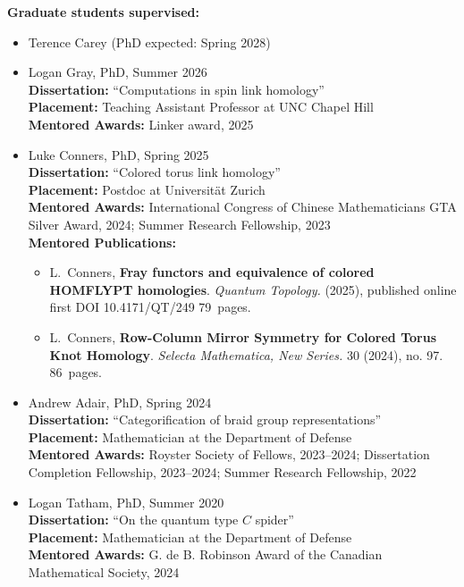 \documentclass[10pt]{article}
\begin{document}
\smallskip
\noindent\textbf{Graduate students supervised:}
\begin{itemize}

\item Terence Carey (PhD expected: Spring 2028)

\item Logan Gray, PhD, Summer 2026 \\
\noindent \textbf{Dissertation:} ``Computations in spin link homology'' \\
\noindent \textbf{Placement:} Teaching Assistant Professor at UNC Chapel Hill \\
\textbf{Mentored Awards:} 
Linker award, 2025


\item Luke Conners, PhD, Spring 2025 \\
\noindent \textbf{Dissertation:} ``Colored torus link homology'' \\
\noindent \textbf{Placement:} Postdoc at Universit\"{a}t Zurich \\
\textbf{Mentored Awards:}
International Congress of Chinese Mathematicians GTA Silver Award, 2024;
Summer Research Fellowship, 2023 \\
\textbf{Mentored Publications:}
\begin{itemize}
\item L.~Conners,
{\bf Fray functors and equivalence of colored HOMFLYPT homologies}.
\emph{Quantum Topology.} 
(2025), published online first DOI 10.4171/QT/249
79~pages.
\item L.~Conners,
{\bf Row-Column Mirror Symmetry for Colored Torus Knot Homology}.
\emph{Selecta Mathematica, New Series.} 30 (2024), no. 97.
86~pages.
\end{itemize}

\item Andrew Adair, PhD, Spring 2024 \\
\noindent \textbf{Dissertation:} ``Categorification of braid group representations'' \\
\noindent \textbf{Placement:} Mathematician at the Department of Defense \\
\textbf{Mentored Awards:} 
Royster Society of Fellows, 2023--2024; 
Dissertation Completion Fellowship, 2023--2024; 
Summer Research Fellowship, 2022

\item Logan Tatham, PhD, Summer 2020 \\
\noindent \textbf{Dissertation:} ``On the quantum type $C$ spider'' \\
\noindent \textbf{Placement:} Mathematician at the Department of Defense \\
\textbf{Mentored Awards:} 
G. de B. Robinson Award of the Canadian Mathematical Society, 2024
\end{itemize}
\end{document}
